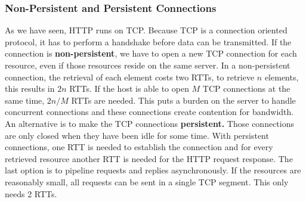 \subsubsection{Non-Persistent and Persistent Connections}
As we have seen, HTTP runs on TCP. Because TCP is a connection oriented protocol, it has to perform a handshake before data can be transmitted. If the connection is \textbf{non-persistent}, we have to open a new TCP connection for each resource, even if those resources reside on the same server. In a non-persistent connection, the retrieval of each element costs two RTTs, to retrieve $n$ elements, this results in $2n$ RTTs. If the host is able to open $M$ TCP connections at the same time, $2n/M$ RTTs are needed. This puts a burden on the server to handle concurrent connections and these connections create contention for bandwidth.\\
An alternative is to make the TCP connections \textbf{persistent.} Those connections are only closed when they have been idle for some time. With persistent connections, one RTT is needed to establish the connection and for every retrieved resource another RTT is needed for the HTTP request response. The last option is to pipeline requests and replies asynchronously. If the resources are reasonably small, all requests can be sent in a single TCP segment. This only needs 2 RTTs.

